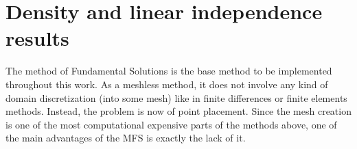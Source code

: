 \label{chap:numerical}

\section{Density and linear independence results}\label{density_proofs_section}

The method of Fundamental Solutions is the base method to be implemented throughout this work. As a meshless method, it does not involve any kind of domain discretization (into some mesh) like in finite differences or finite elements methods. Instead, the problem is now of point placement. Since the mesh creation is one of the most computational expensive parts of the methods above, one of the main advantages of the MFS is exactly the lack of it. 


